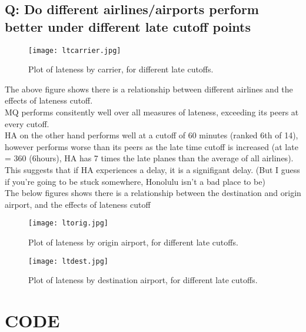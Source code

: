 \documentclass[12pt]{article}
\begin{document}
		\subsection{Q: Do different airlines/airports perform better under different late cutoff points}
		\begin{figure}[h!]
			\centering
			\texttt{[image: ltcarrier.jpg]}
			\caption{Plot of lateness by carrier, for different late cutoffs.}
		\end{figure}
		The above figure shows there is a relationship between different airlines and the effects of lateness cutoff. \\
		MQ performs consitently well over all measures of lateness, exceeding its peers at every cutoff.
		\\HA on the other hand performs well at a cutoff of 60 minutes (ranked 6th of 14), however performs worse than its peers as the late time cutoff is increased (at late = 360 (6hours), HA has 7 times the late planes than the average of all airlines). This suggests that if HA experiences a delay, it is a signifigant delay. (But I guess if you're going to be stuck somewhere, Honolulu isn't a bad place to be)
		\\The below figures shows there is a relationship between the destination and origin airport, and the effects of lateness cutoff		
	\newpage
		\begin{figure}[h!]
			\centering
			\texttt{[image: ltorig.jpg]}
			\caption{Plot of lateness by origin airport, for different late cutoffs.}
			\texttt{[image: ltdest.jpg]}
			\caption{Plot of lateness by destination airport, for different late cutoffs.}
		\end{figure}
	\clearpage
	\section{CODE}
\end{document}
